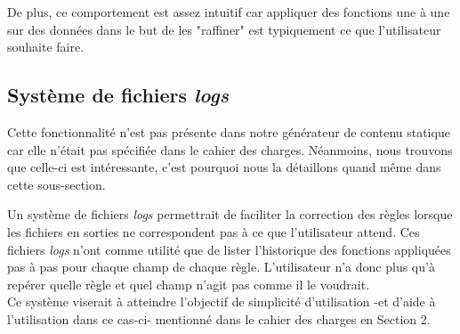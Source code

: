 		De plus, ce comportement est assez intuitif car appliquer des fonctions une à une sur des données dans le but de les "raffiner" est typiquement ce que l'utilisateur souhaite faire. 
	
	\subsection{Système de fichiers \textit{logs}}
	
		\begin{note}
			Cette fonctionnalité n'est pas présente dans notre générateur de contenu statique car elle n'était pas spécifiée dans le cahier des charges. Néanmoins, nous trouvons que celle-ci est intéressante, c'est pourquoi nous la détaillons quand même dans cette sous-section.
		\end{note}
	
		Un système de fichiers \textit{logs} permettrait de faciliter la correction des règles lorsque les fichiers en sorties ne correspondent pas à ce que l'utilisateur attend. Ces fichiers \textit{logs} n'ont comme utilité que de lister l'historique des fonctions appliquées pas à pas pour chaque champ de chaque règle. L'utilisateur n'a donc plus qu'à repérer quelle règle et quel champ n'agit pas comme il le voudrait.\\
		
		Ce système viserait à atteindre l'objectif de simplicité d'utilisation -et d'aide à l'utilisation dans ce cas-ci- mentionné dans le cahier des charges en Section 2.
		
		